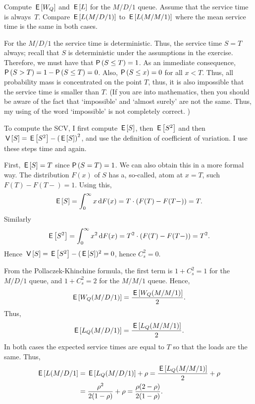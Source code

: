 \begin{exercise}
  Compute $\,\mathsf{E}\left[W_Q\right]$ and $\,\mathsf{E}\left[L\right]$ for the $M/D/1$ queue. Assume that the
  service time is always~$T$. Compare $\,\mathsf{E}\left[L(M/D/1)\right]$ to $\,\mathsf{E}\left[L(M/M/1)\right]$
  where the mean service time is the same in both cases.
\begin{solution}
  For the $M/D/1$ the service time is deterministic. Thus, the service time $S=T$ always; recall that $S$ is   deterministic under the assumptions in the exercise. Therefore, we
  must have that $\P{S\leq T} = 1$. As an immediate consequence,
  $\P{S>T} = 1-\P{S\leq T} = 0$. Also, $\P{S \leq x} = 0$ for all
  $x<T$. Thus, all probability mass is concentrated on the point $T$,
  thus, it is also impossible that the service time is smaller than
  $T$.  (If you are into mathematics, then you should be aware of the fact
  that `impossible' and `almost surely' are not the same. Thus, my
  using of the word `impossible' is not completely correct. )

  To compute the SCV, I first compute $\,\mathsf{E}\left[S\right]$, then $\,\mathsf{E}\left[S^2\right]$ and then
  $\,\mathsf{V}\left[S\right] = \,\mathsf{E}\left[S^2\right] - \left(\,\mathsf{E}\left[S\right]\right)^2$, and use the definition of
  coefficient of variation. I use these steps time and again.

  First, $\,\mathsf{E}\left[S\right] = T$ since $\P{S=T} =1$. We can also obtain this in a
  more formal way. The distribution $F(x)$ of $S$ has a, so-called, atom at
  $x=T$, such $F(T) - F(T-) =1$.  Using this,
  \begin{equation*}
    \,\mathsf{E}\left[S\right] = \int_0^\infty x \,\text{d}F(x) = T\cdot (F(T)-F(T-)) = T.
  \end{equation*}
Similarly
\begin{equation*}
\,\mathsf{E}\left[S^2\right] = \int_0^\infty x^2 \,\text{d}F(x) = T^2\cdot (F(T)-F(T-)) = T^2.
\end{equation*}
Hence $\,\mathsf{V}\left[S\right] = \,\mathsf{E}\left[S^2\right] - (\,\mathsf{E}\left[S\right])^2 = 0$, hence $C_s^2 = 0$.

From the Pollaczek-Khinchine formula, the first term is $1+C_s^2=1$ for the $M/D/1$ queue, and $1+C_s^2=2$ for the $M/M/1$ queue. Hence, 
  \begin{equation*}
\,\mathsf{E}\left[W_Q(M/D/1)\right] = \frac{\,\mathsf{E}\left[W_Q(M/M/1)\right]}2.
  \end{equation*}
Thus, 
\begin{equation*}
 \,\mathsf{E}\left[L_Q(M/D/1)\right] = \frac{\,\mathsf{E}\left[L_Q(M/M/1)\right]}2.    
\end{equation*}
In both cases the expected service times are equal to $T$ so that the loads are the same. Thus, 
\begin{equation*}
  \begin{split}
 \,\mathsf{E}\left[L(M/D/1\right] &= \,\mathsf{E}\left[L_Q(M/D/1)\right] +\rho = \frac{\,\mathsf{E}\left[L_Q(M/M/1)\right]}2 + \rho \\
&= \frac{\rho^2}{2(1-\rho)} + \rho=\frac{\rho(2-\rho)} {2(1-\rho)}.
  \end{split}
\end{equation*}
\end{solution}
\end{exercise}

